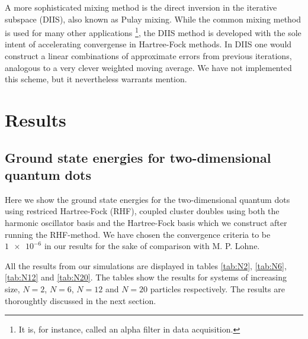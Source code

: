 \documentclass[
    a4paper, aps, twocolumn, floatfix, superscriptaddress,
    nofootinbib]{revtex4-1}
\newcommand{\1}{\mathds{1}}
\begin{document}
        A more sophisticated mixing method is the direct inversion
        in the iterative subspace (DIIS), also known as Pulay mixing. While the
        common mixing method is used for many other applications
        \footnote{It is, for instance, called an alpha filter in data acquisition.},
        the DIIS method is developed with the sole intent of accelerating
        convergense in Hartree-Fock methods. In DIIS one would construct a
        linear combinations of approximate errors from previous iterations,
        analogous to a very clever weighted moving average. We have not implemented
        this scheme, but it nevertheless warrants mention.

\section{Results}

    \subsection{Ground state energies for two-dimensional quantum dots}
        Here we show the ground state energies for the two-dimensional quantum
        dots using restriced Hartree-Fock (RHF), coupled cluster doubles using
        both the harmonic oscillator basis and the Hartree-Fock basis which we
        construct after running the RHF-method. We have chosen the convergence
        criteria to be $\num{1e-6}$ in our results for the sake of comparison
        with M. P. Lohne\cite{lohne2011ab}.

        All the results from our simulations are displayed in tables
        \ref{tab:N2}, \ref{tab:N6}, \ref{tab:N12} and \ref{tab:N20}. The tables
        show the results for systems of increasing size, $N=2$, $N=6$, $N=12$
        and $N=20$ particles respectively. The results are thoroughtly discussed
        in the next section.
\end{document}
